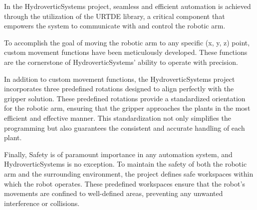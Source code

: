 \documentclass[Setup/main.tex]{subfiles}
\begin{document}
In the HydroverticSystems project, seamless and efficient automation is achieved through the utilization of the URTDE library, a critical component that empowers the system to communicate with and control the robotic arm. 


To accomplish the goal of moving the robotic arm to any specific (x, y, z) point, custom movement functions have been meticulously developed. These functions are the cornerstone of HydroverticSystems' ability to operate with precision. 

In addition to custom movement functions, the HydroverticSystems project incorporates three predefined rotations designed to align perfectly with the gripper solution. These predefined rotations provide a standardized orientation for the robotic arm, ensuring that the gripper approaches the plants in the most efficient and effective manner. This standardization not only simplifies the programming but also guarantees the consistent and accurate handling of each plant.


Finally, Safety is of paramount importance in any automation system, and HydroverticSystems is no exception. To maintain the safety of both the robotic arm and the surrounding environment, the project defines safe workspaces within which the robot operates. These predefined workspaces ensure that the robot's movements are confined to well-defined areas, preventing any unwanted interference or collisions. 
\end{document}
